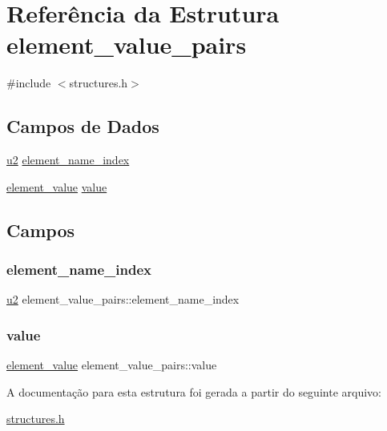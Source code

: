 \hypertarget{structelement__value__pairs}{}\section{Referência da Estrutura element\+\_\+value\+\_\+pairs}
\label{structelement__value__pairs}


{\ttfamily \#include $<$structures.\+h$>$}

\subsection*{Campos de Dados}
\begin{DoxyCompactItemize}
\item 
\hyperlink{lista__operandos_8h_a732cde1300aafb73b0ea6c2558a7a54f}{u2} \hyperlink{structelement__value__pairs_afbd19773ad9b0623269f7fbd649b6220}{element\+\_\+name\+\_\+index}
\item 
\hyperlink{structelement__value}{element\+\_\+value} \hyperlink{structelement__value__pairs_ab1c879e0865cca531bd7565a71995668}{value}
\end{DoxyCompactItemize}


\subsection{Campos}
\mbox{\label{structelement__value__pairs_afbd19773ad9b0623269f7fbd649b6220}} 
\subsubsection{\texorpdfstring{element\+\_\+name\+\_\+index}{element\_name\_index}}
{\footnotesize\ttfamily \hyperlink{lista__operandos_8h_a732cde1300aafb73b0ea6c2558a7a54f}{u2} element\+\_\+value\+\_\+pairs\+::element\+\_\+name\+\_\+index}

\mbox{\label{structelement__value__pairs_ab1c879e0865cca531bd7565a71995668}} 
\subsubsection{\texorpdfstring{value}{value}}
{\footnotesize\ttfamily \hyperlink{structelement__value}{element\+\_\+value} element\+\_\+value\+\_\+pairs\+::value}



A documentação para esta estrutura foi gerada a partir do seguinte arquivo\+:\begin{DoxyCompactItemize}
\item 
\hyperlink{structures_8h}{structures.\+h}\end{DoxyCompactItemize}
